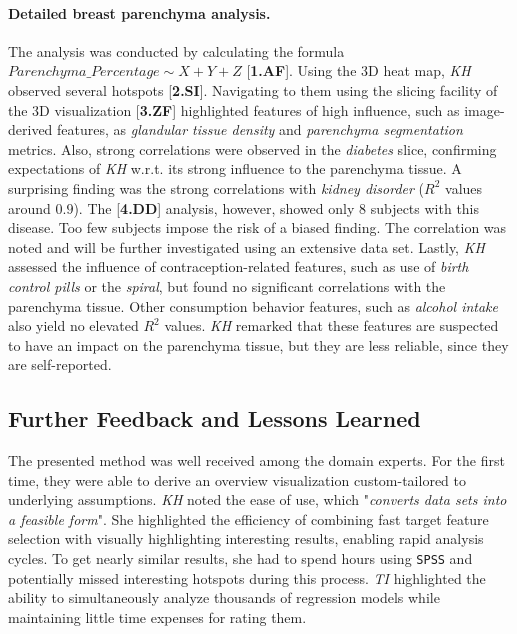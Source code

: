 \documentclass[journal]{style/vgtc} 			          %
\begin{document}
\paragraph{Detailed breast parenchyma analysis.}
The analysis was conducted by calculating the formula $Parenchyma\_Percentage \sim X + Y + Z$ [\textbf{1.AF}].
Using the 3D heat map, \emph{KH} observed several hotspots [\textbf{2.SI}].
Navigating to them using the slicing facility of the 3D visualization [\textbf{3.ZF}] highlighted features of high influence, such as image-derived features, as \emph{glandular tissue density} and \emph{parenchyma segmentation} metrics.
Also, strong correlations were observed in the \emph{diabetes} slice, confirming expectations of \emph{KH} w.r.t. its strong influence to the parenchyma tissue.
A surprising finding was the strong correlations with \emph{kidney disorder} ($R^2$ values around $0.9$).
The [\textbf{4.DD}] analysis, however, showed only 8 subjects with this disease.
Too few subjects impose the risk of a biased finding.
The correlation was noted and will be further investigated using an extensive data set.
Lastly, \emph{KH} assessed the influence of contraception-related features, such as use of \emph{birth control pills} or the \emph{spiral}, but found no significant correlations with the parenchyma tissue.
Other consumption behavior features, such as \emph{alcohol intake} also yield no elevated $R^2$ values.
\emph{KH} remarked that these features are suspected to have an impact on the parenchyma tissue, but they are less reliable, since they are self-reported.
\subsection{Further Feedback and Lessons Learned} \label{Lessons Learned}
The presented method was well received among the domain experts.
For the first time, they were able to derive an overview visualization custom-tailored to underlying assumptions.
\emph{KH} noted the ease of use, which "\emph{converts data sets into a feasible form}".
She highlighted the efficiency of combining fast target feature selection with visually highlighting interesting results, enabling rapid analysis cycles.
To get nearly similar results, she had to spend hours using \texttt{SPSS} and potentially missed interesting hotspots during this process.
\emph{TI} highlighted the ability to simultaneously analyze thousands of regression models while maintaining little time expenses for rating them.
\end{document}
